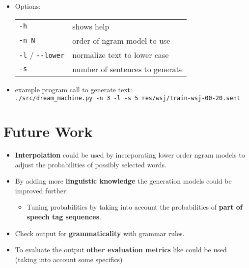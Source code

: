 \documentclass[a0,boxedsections,landscape]{sciposter}
\begin{document}
\begin{multicols}{3}

\begin{itemize}

    \item Options:\\[.5ex]
    \begin{listliketab}
        \begin{tabular}{ll}
            \verb+-h+ & shows help \\
            \verb+-n N+ & order of ngram model to use \\
            \verb+-l+ / \verb+--lower+ & normalize text to lower case \\
            \verb+-s+ & number of sentences to generate \\
        \end{tabular}
    \end{listliketab}
    \item example program call to generate text: \\
        \verb+./src/dream_machine.py -n 3 -l -s 5 res/wsj/train-wsj-00-20.sent+

\end{itemize}


\section{Future Work}

\begin{itemize}
    
    
    \item \textbf{Interpolation} could be used by incorporating lower order ngram models to adjust the probabilities of possibly selected words.

    \item By adding more \textbf{linguistic knowledge} the generation models could be improved further.

    \begin{itemize}
        \item Tuning probabilities by taking into account the probabilities of \textbf{part of speech tag sequences}.
    \end{itemize}
    
    \item Check output for \textbf{grammaticality} with grammar rules.
    
    \item To evaluate the output \textbf{other evaluation metrics} like could be used\\
    \small{(taking into account some specifics)}
    

\end{itemize}
\end{multicols}
\end{document}
